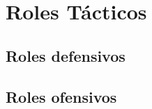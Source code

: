 \medskip
\section{Roles Tácticos}

\medskip
\subsection{Roles defensivos}

\medskip
\subsection{Roles ofensivos}
